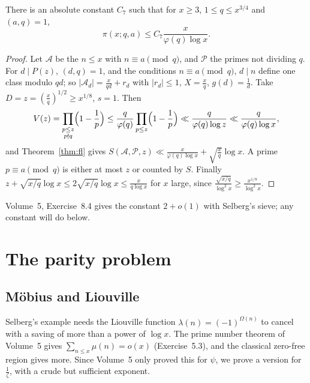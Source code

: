 \begin{corollary}\label{cor:btap}
There is an absolute constant $C_7$ such that for $x\ge3$, $1\le q\le x^{3/4}$ and $(a,q)=1$,
\[
\pi(x;q,a)\le C_7\frac x{\varphi(q)\log x}.
\]
\end{corollary}
\begin{proof}
Let $\mathcal A$ be the $n\le x$ with $n\equiv a\pmod q$, and $\mathcal P$ the primes not dividing $q$. For $d\mid P(z)$, $(d,q)=1$, and the conditions $n\equiv a\pmod q$, $d\mid n$ define one class modulo $qd$; so $|\mathcal A_d|=\frac x{qd}+r_d$ with $|r_d|\le1$, $X=\frac xq$, $g(d)=\frac1d$. Take $D=z=(\frac xq)^{1/2}\ge x^{1/8}$, $s=1$. Then
\[
V(z)=\prod_{\substack{p\le z\\p\nmid q}}\Bigl(1-\frac1p\Bigr)\le\frac q{\varphi(q)}\prod_{p\le z}\Bigl(1-\frac1p\Bigr)\ll\frac q{\varphi(q)\log z}\ll\frac q{\varphi(q)\log x},
\]
and Theorem~\ref{thm:fl} gives $S(\mathcal A,\mathcal P,z)\ll\frac x{\varphi(q)\log x}+\sqrt{\tfrac xq}\log x$. A prime $p\equiv a\pmod q$ is either at most $z$ or counted by $S$. Finally $z+\sqrt{x/q}\log x\le2\sqrt{x/q}\log x\le\frac x{q\log x}$ for $x$ large, since $\frac{\sqrt{x/q}}{\log^2x}\ge\frac{x^{1/8}}{\log^2x}$.
\end{proof}

Volume~5, Exercise~8.4 gives the constant $2+o(1)$ with Selberg's sieve; any constant will do below.

\section{The parity problem}

\subsection*{Möbius and Liouville}

Selberg's example needs the Liouville function $\lambda(n)=(-1)^{\Omega(n)}$ to cancel with a saving of more than a power of $\log x$. The prime number theorem of Volume~5 gives $\sum_{n\le x}\mu(n)=o(x)$ (Exercise~5.3), and the classical zero-free region gives more. Since Volume~5 only proved this for $\psi$, we prove a version for $\frac1\zeta$, with a crude but sufficient exponent.


